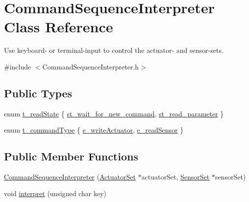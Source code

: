 \hypertarget{classCommandSequenceInterpreter}{\section{Command\-Sequence\-Interpreter Class Reference}
\label{classCommandSequenceInterpreter}
}


Use keyboard-\/ or terminal-\/input to control the actuator-\/ and sensor-\/sets.  




{\ttfamily \#include $<$Command\-Sequence\-Interpreter.\-h$>$}

\subsection*{Public Types}
\begin{DoxyCompactItemize}
\item 
enum \hyperlink{classCommandSequenceInterpreter_a651640c84d800a896ccd8291a93128a0}{t\-\_\-read\-State} \{ \hyperlink{classCommandSequenceInterpreter_a651640c84d800a896ccd8291a93128a0a658adac09e435337a98ccbe2f74cdafa}{st\-\_\-wait\-\_\-for\-\_\-new\-\_\-command}, 
\hyperlink{classCommandSequenceInterpreter_a651640c84d800a896ccd8291a93128a0a5b0174436df6e847d871f05feddc755a}{st\-\_\-read\-\_\-parameter}
 \}
\item 
enum \hyperlink{classCommandSequenceInterpreter_a96f5e5d9fa213d5e6a9bb0e3fb7fabd8}{t\-\_\-command\-Type} \{ \hyperlink{classCommandSequenceInterpreter_a96f5e5d9fa213d5e6a9bb0e3fb7fabd8ab9a8f3bd83268621ea2e2ec5ac19e900}{e\-\_\-write\-Actuator}, 
\hyperlink{classCommandSequenceInterpreter_a96f5e5d9fa213d5e6a9bb0e3fb7fabd8a6bc4cdc026336f37ebec76e878ca3718}{e\-\_\-read\-Sensor}
 \}
\end{DoxyCompactItemize}
\subsection*{Public Member Functions}
\begin{DoxyCompactItemize}
\item 
\hyperlink{classCommandSequenceInterpreter_ae14fc280499fea9ae536b6bdfb40f0f9}{Command\-Sequence\-Interpreter} (\hyperlink{classActuatorSet}{Actuator\-Set} $\ast$actuator\-Set, \hyperlink{classSensorSet}{Sensor\-Set} $\ast$sensor\-Set)
\item 
void \hyperlink{classCommandSequenceInterpreter_a50bffc4e9f2b6953ed64cc62f6c65b9d}{interpret} (unsigned char key)
\end{DoxyCompactItemize}
